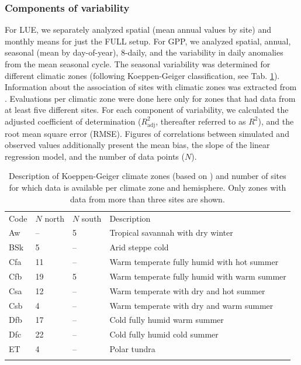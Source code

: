 \documentclass[gmd, manuscript]{copernicus}
\begin{document}
\subsubsection{Components of variability}
\label{sec:evalmethod_variability}
For LUE, we separately analyzed spatial (mean annual values by site) and monthly means for just the FULL setup. For GPP, we analyzed spatial, annual, seasonal (mean by day-of-year), 8-daily, and the variability in daily anomalies from the mean seasonal cycle. The seasonal variability was determined for different climatic zones (following Koeppen-Geiger classification, see Tab. \ref{tab:kgclimate}). Information about the association of sites with climatic zones was extracted from \citet{falge17}. Evaluations per climatic zone were done here only for zones that had data from at least five different sites. For each component of variability, we calculated the adjusted coefficient of determination ($R^2_\text{adj}$, thereafter referred to as $R^2$), and the root mean square error (RMSE). Figures of correlations between simulated and observed values additionally present the mean bias, the slope of the linear regression model, and the number of data points ($N$).

\begin{table}
\caption{Description of Koeppen-Geiger climate zones (based on \citet{falge17}) and number of sites for which data is available per climate zone and hemisphere. Only zones with data from more than three sites are shown.}
\begin{tabular}{llll}
\tophline
  Code & $N$ north & $N$ south & Description \\ 
\middlehline
   Aw   & -- & 5 &  Tropical savannah with dry winter \\ 
   BSk  & 5 & -- & Arid steppe cold \\ 
   Cfa  & 11 & -- & Warm temperate fully humid with hot summer \\ 
   Cfb  & 19 & 5 & Warm temperate fully humid with warm summer \\ 
   Csa  & 12 & -- & Warm temperate with dry and hot summer \\ 
   Csb  & 4 & -- & Warm temperate with dry and warm summer \\ 
   Dfb  & 17 & -- & Cold fully humid warm summer \\ 
   Dfc  & 22 & -- & Cold fully humid cold summer \\ 
   ET   & 4 & -- & Polar tundra \\ 
\bottomhline
\end{tabular}
\belowtable{} %
  \label{tab:kgclimate}
\end{table}
\end{document}
